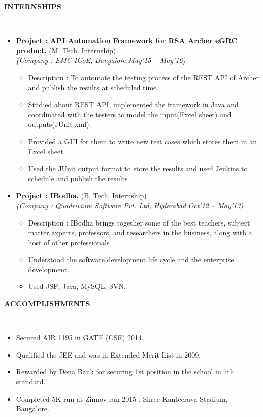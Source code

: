 \documentclass[a4paper,10pt]{article}
\newcommand{\isep}{-2 pt}
\newcommand{\lsep}{-0.5cm}
\newcommand{\resheading}[1]{{\small \colorbox{mygrey}{\begin{minipage}{0.975\textwidth}{\textbf{#1 \vphantom{p\^{E}}}}\end{minipage}}}}
\begin{document}
\resheading{\textbf{INTERNSHIPS} }\\[\lsep]
\begin{itemize}
    \item \textbf{Project : API Automation Framework for RSA Archer eGRC product.} (M. Tech. Internship) \\
    \emph{(Company : EMC ICoE, Bangalore.May'15 – May'16)} \\[-0.6cm]
	\begin{itemize}\itemsep \isep
	
	    \item Description : To automate the testing process of the REST API of Archer and publish the results at scheduled time.
	    \item Studied about REST API, implemented the framework in Java and coordinated with the testers to model the input(Excel sheet) and outputs(JUnit xml). \item Provided a GUI for them to write new test cases which stores them in an Excel sheet.
	    \item Used the JUnit output format to store the results and used Jenkins%
	    to schedule and publish the results
	
	\end{itemize}
	
	\item \textbf{Project : IBodha.} (B. Tech. Internship) \\
    \emph{(Company : Quadrivium Software Pvt. Ltd, Hyderabad.Oct'12 – May'13)} \\[-0.6cm]
	\begin{itemize}\itemsep \isep
	
	    \item Description : IBodha brings together some of the best teachers, subject matter experts, professors, and researchers in the business, along with a host of other professionals
	    \item Understood the software development life cycle and the enterprise development.
	    \item Used JSF, Java, MySQL, SVN.
	    
    \end{itemize}

\end{itemize}


\resheading{\textbf{ACCOMPLISHMENTS} }\\[\lsep]
\begin{itemize} \itemsep \isep
    \item Secured AIR 1195 in GATE (CSE) 2014.
    \item Qualified the JEE and was in Extended Merit List in 2009.
    \item Rewarded by Dena Bank for securing 1st position in the school in 7th standard.
    \item Completed 5K run at Zinnov run 2015 , Shree Kanteerava Stadium, Bangalore.
\end{itemize}
\end{document}
